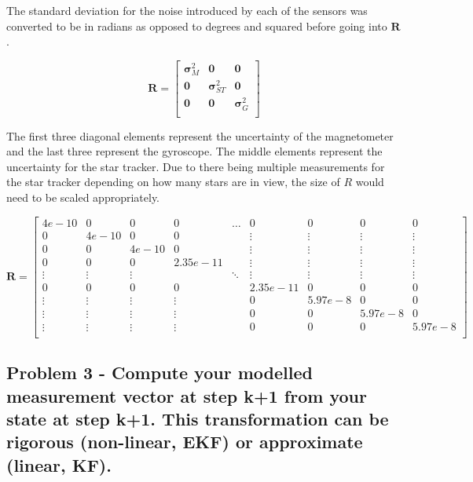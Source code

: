 The standard deviation for the noise introduced by each of the sensors was converted to be in radians as opposed to degrees and squared before going into $\boldsymbol{R}$.

\begin{equation} \label{eq:full_sens_matrix}
    \boldsymbol{R} = \begin{bmatrix}
        \boldsymbol{\sigma}_{M}^2 & \boldsymbol{0} & \boldsymbol{0} \\
        \boldsymbol{0} & \boldsymbol{\sigma}_{ST}^2 & \boldsymbol{0} \\
        \boldsymbol{0} & \boldsymbol{0} & \boldsymbol{\sigma}_{G}^2 \\
    \end{bmatrix}
\end{equation}

The first three diagonal elements represent the uncertainty of the magnetometer and the last three represent the gyroscope. The middle elements represent the uncertainty for the star tracker. Due to there being multiple measurements for the star tracker depending on how many stars are in view, the size of $R$ would need to be scaled appropriately. 

\small
\begin{equation*} 
    \boldsymbol{R} = \begin{bmatrix} 
        4e-10 & 0 & 0 & 0 & \dots & 0 & 0 & 0 & 0\\
        0 & 4e-10 & 0 & 0 &  & \vdots & \vdots & \vdots & \vdots \\
        0 & 0 & 4e-10 & 0 &  & \vdots & \vdots & \vdots & \vdots \\
        0 & 0 & 0 & 2.35e-11 &  & \vdots & \vdots & \vdots & \vdots \\
        \vdots & \vdots & \vdots & &  \ddots &\vdots &\vdots&\vdots & \vdots\\
        0 & 0 & 0 & 0 &  & 2.35e-11 & 0 & 0 & 0 \\
        \vdots & \vdots & \vdots & \vdots & & 0 & 5.97e-8 & 0 & 0 \\
        \vdots & \vdots & \vdots & \vdots & & 0 & 0 & 5.97e-8 & 0  \\
        \vdots & \vdots & \vdots & \vdots &  & 0 & 0 & 0 & 5.97e-8\\
    \end{bmatrix} 
\end{equation*}
\normalsize

\subsection{Problem 3 - Compute your modelled measurement vector at step k+1 from your state at step k+1. This transformation can be rigorous (non-linear, EKF) or approximate (linear, KF).}

